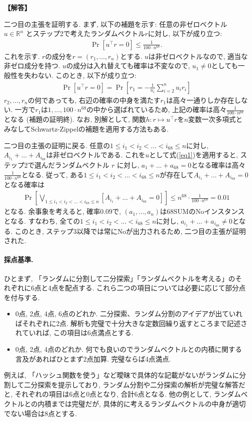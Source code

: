 \documentclass[12pt,a4paper]{article}
\newenvironment{solution}{
    \vspace{0.5em}
    \begin{tcolorbox}[colback=white, colframe=black, boxrule=1pt, arc=0mm, breakable]
    \noindent
    \textbf{【解答】}
    \vspace{0.3em}
}{
    \end{tcolorbox}
    \vspace{1em}
}
\begin{document}
\begin{solution}
  二つ目の主張を証明する. まず, 以下の補題を示す:
  任意の非ゼロベクトル $u\in \mathbb{R}^n$ とステップ2で考えたランダムベクトル$r$に対し, 以下が成り立つ:
  \begin{align}
    \Pr\left[u^\top r = 0\right] \le \frac{1}{100\cdot n^{68}}. \label{eq1}
  \end{align}
  これを示す. $r$の成分を$r=(r_1,\dots,r_n)$とする. $u$は非ゼロベクトルなので, 適当な非ゼロ成分を持つ. $u$の成分は入れ替えても確率は不変なので, $u_1\ne 0$としても一般性を失わない. このとき, 以下が成り立つ:
  \begin{align*}
    \Pr\left[u^\top r = 0\right] = \Pr\left[r_1 = -\frac{1}{u_1} \sum_{i=2}^n u_i r_i\right]
  \end{align*}
  $r_2,\dots,r_n$の何であっても, 右辺の確率の中身を満たす$r_1$は高々一通りしか存在しない. 一方で$r_1$は$1,\dots,100\cdot n^{68}$の中から選ばれているため, 上記の確率は高々$\frac{1}{100\cdot n^{68}}$となる (補題の証明終). なお, 別解として, 関数$h\colon r \mapsto u^\top r$を$n$変数一次多項式とみなしてSchwartz-Zippelの補題を適用する方法もある.

  二つ目の主張の証明に戻る. 任意の$1\le i_{1} < i_2 < \dots < i_{68} \le n$に対し, $A_{i_1}+\dots+A_{i_{68}}$は非ゼロベクトルである. これを$u$として式(\ref{eq1})を適用すると, ステップ2で選んだランダムベクトル $r$ に対し, $a_1+\dots+a_{68}=0$となる確率は高々$\frac{1}{100\cdot n^{68}}$となる. 従って, ある$1\le i_{1} < i_2 < \dots < i_{68} \le n$が存在して$A_{i_1}+\dots+A_{i_{68}}=0$となる確率は
  \begin{align*}
    \Pr\left[\bigvee_{1\le i_{1} < i_2 < \dots < i_{68} \le n} [A_{i_1}+\dots+A_{i_{68}}=0]\right] \le n^{68} \cdot \frac{1}{100\cdot n^{68}} = 0.01
  \end{align*}
  となる.
  余事象を考えると, 確率$0.09$で, $(a_1,\dots,a_n)$は68SUMのNoインスタンスとなる. すなわち, 全ての$1\le i_1 < i_2 < \dots < i_{68} \le n$に対し, $a_{i_1}+\dots+a_{i_{68}}\ne 0$となる. このとき, ステップ3以降では常にNoが出力されるため, 二つ目の主張が証明された.

  \paragraph*{採点基準.}
  ひとまず, 「ランダムに分割して二分探索」「ランダムベクトルを考える」のそれぞれに6点と4点を配点する. これら二つの項目については必要に応じて部分点を付与する.
  \begin{itemize}
    \item 0点, 2点, 4点, 6点のどれか. 二分探索、ランダム分割のアイデアが出ていればそれぞれに2点. 解析も完璧で十分大きな定数回繰り返すところまで記述されていれば, この項目は6点満点とする.
    \item 0点, 2点, 4点のどれか. 何でも良いのでランダムベクトルとの内積に関する言及があればひとまず2点加算. 完璧ならば4点満点.
  \end{itemize}
  例えば, 「ハッシュ関数を使う」など曖昧で具体的な記載がないがランダムに分割して二分探索を提示しており, ランダム分割や二分探索の解析が完璧な解答だと, それぞれの項目は6点と0点となり, 合計6点となる. 他の例として, ランダムベクトルとの内積までは完璧だが, 具体的に考えるランダムベクトルの中身が適切でない場合は8点とする.


\end{solution}
\end{document}
